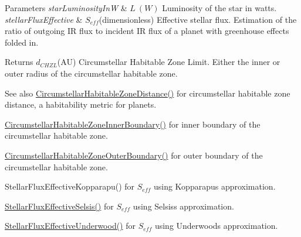\begin{DoxyParams}{Parameters}
{\em star\+Luminosity\+InW} & $L\ (W)$ Luminosity of the star in watts. \\
\hline
{\em stellar\+Flux\+Effective} & $S_{eff}$(dimensionless) Effective stellar flux. Estimation of the ratio of outgoing IR flux to incident IR flux of a planet with greenhouse effects folded in. \\
\hline
\end{DoxyParams}
\begin{DoxyReturn}{Returns}
$d_{CHZL}$(AU) Circumstellar Habitable Zone Limit. Either the inner or outer radius of the circumstellar habitable zone. 
\end{DoxyReturn}
\begin{DoxySeeAlso}{See also}
\mbox{\hyperlink{group___e_g_x_phys-_circumstellar_habitable_zone_limit_gaf289fb8f037ece66d850f7d827f83752}{Circumstellar\+Habitable\+Zone\+Distance()}} for circumstellar habitable zone distance, a habitability metric for planets. 

\mbox{\hyperlink{group___e_g_x_phys-_circumstellar_habitable_zone_limit_gab31a33d0dbd3ecd00537832b5b836d73}{Circumstellar\+Habitable\+Zone\+Inner\+Boundary()}} for inner boundary of the circumstellar habitable zone. 

\mbox{\hyperlink{group___e_g_x_phys-_circumstellar_habitable_zone_limit_ga3a6dbbdaddddd071cb1f0a20e40d83bd}{Circumstellar\+Habitable\+Zone\+Outer\+Boundary()}} for outer boundary of the circumstellar habitable zone. 

Stellar\+Flux\+Effective\+Kopparapu() for $S_{eff}$ using Kopparapu\textquotesingle{}s approximation. 

\mbox{\hyperlink{group___e_g_x_phys-_circumstellar_habitable_zone_limit_ga0eb1003b4cfcbcafde635cefca5ae5c2}{Stellar\+Flux\+Effective\+Selsis()}} for $S_{eff}$ using Selsis\textquotesingle{}s approximation. 

\mbox{\hyperlink{group___e_g_x_phys-_circumstellar_habitable_zone_limit_gafe02cffcc63c39794feb6f1de5e7a9bb}{Stellar\+Flux\+Effective\+Underwood()}} for $S_{eff}$ using Underwood\textquotesingle{}s approximation. 
\end{DoxySeeAlso}
\mbox{\label{group___e_g_x_phys-_circumstellar_habitable_zone_limit_ga3a6dbbdaddddd071cb1f0a20e40d83bd}} 

